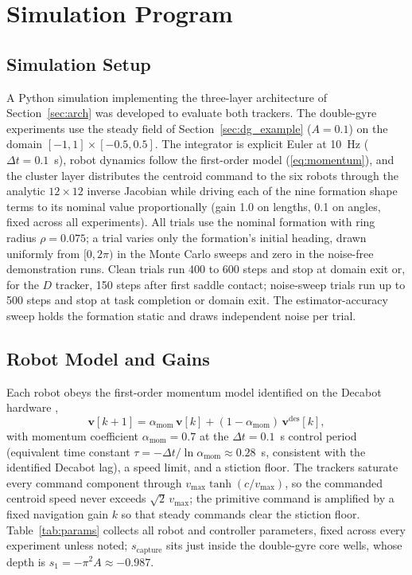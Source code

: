 \documentclass[lettersize,journal]{IEEEtran}
\begin{document}
\section{Simulation Program}
\label{sec:methods}

\subsection{Simulation Setup}

A Python simulation implementing the three-layer architecture of
Section~\ref{sec:arch} was developed to evaluate both trackers.
The double-gyre experiments use the steady field of
Section~\ref{sec:dg_example} ($A = 0.1$) on the domain $[-1, 1] \times
[-0.5, 0.5]$. The integrator is explicit Euler at 10~Hz ($\Delta t =
0.1$~s), robot dynamics follow the first-order model
(\ref{eq:momentum}), and the cluster layer distributes the centroid
command to the six robots through the analytic $12 \times 12$ inverse
Jacobian while driving each of the nine formation shape terms to its
nominal value proportionally (gain 1.0 on lengths, 0.1 on angles, fixed
across all experiments). All trials use the nominal formation with ring
radius $\rho = 0.075$; a trial varies only the formation's initial
heading, drawn uniformly from $[0, 2\pi)$ in the Monte Carlo sweeps and
zero in the noise-free demonstration runs. Clean trials run 400 to 600
steps and stop at domain exit or, for the $D$ tracker, 150 steps after
first saddle contact; noise-sweep trials run up to 500 steps and stop
at task completion or domain exit. The estimator-accuracy sweep holds
the formation static and draws independent noise per trial.

\subsection{Robot Model and Gains}
\label{sec:robot_model}

Each robot obeys the first-order momentum model identified on the
Decabot hardware \cite{14},
\begin{equation}
    \mathbf{v}[k+1] = \alpha_{\text{mom}}\,\mathbf{v}[k]
    + (1 - \alpha_{\text{mom}})\,\mathbf{v}^{\text{des}}[k],
    \label{eq:momentum}
\end{equation}
with momentum coefficient $\alpha_{\text{mom}} = 0.7$ at the
$\Delta t = 0.1$~s control period (equivalent time constant $\tau =
-\Delta t/\ln\alpha_{\text{mom}} \approx 0.28$~s, consistent with the
identified Decabot lag), a speed limit, and a stiction floor.
The trackers saturate every command component through
$v_{\max}\tanh(c/v_{\max})$, so the commanded centroid speed never
exceeds $\sqrt{2}\,v_{\max}$; the primitive command is amplified by a
fixed navigation gain $k$ so that steady commands clear the stiction
floor. Table~\ref{tab:params} collects all robot and controller
parameters, fixed across every experiment unless noted;
$s_{\text{capture}}$ sits just inside the double-gyre core wells, whose
depth is $s_1 = -\pi^2 A \approx -0.987$.
\end{document}
